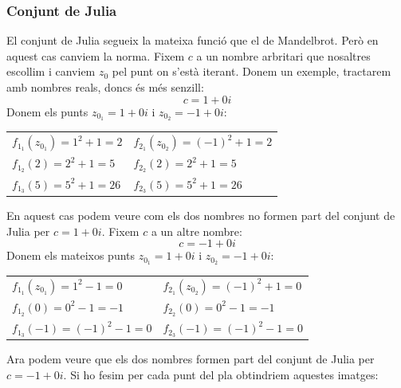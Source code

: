 \subsubsection{Conjunt de Julia}
El conjunt de Julia segueix la mateixa funció que el de Mandelbrot. Però en aquest cas canviem la norma. Fixem $c$ a un nombre arbritari que nosaltres escollim i canviem $z_0$ pel punt on s'està iterant. Donem un exemple, tractarem amb nombres reals, doncs és més senzill:
\[c = 1 + 0i\]
Donem els punts $z_{0_1} = 1 + 0i$ i $z_{0_2} = -1 + 0i$: \newline
\begin{center}
\begin{tabularx}{0.8\textwidth} {
  >{\centering\arraybackslash}X |
  >{\centering\arraybackslash}X}
  \(f_{1_1}(z_{0_1}) = 1^2 + 1 = 2\) \vspace*{3mm} & \(f_{2_1}(z_{0_2}) = (-1)^2 + 1 = 2\) \\
  \(f_{1_2}(2) = 2^2 + 1 = 5\) \vspace*{3mm} & \(f_{2_2}(2) = 2^2 + 1 = 5\) \\
  \(f_{1_3}(5) = 5^2 + 1 = 26\) & \(f_{2_3}(5) = 5^2 + 1 = 26\)
\end{tabularx}
\end{center}
\noindent \newline
En aquest cas podem veure com els dos nombres no formen part del conjunt de Julia per $c = 1 + 0i$. \n
Fixem $c$ a un altre nombre:
\[c = -1 + 0i\]
Donem els mateixos punts $z_{0_1} = 1 + 0i$ i $z_{0_2} = -1 + 0i$: \newline
\begin{center}
\begin{tabularx}{0.8\textwidth} {
  >{\centering\arraybackslash}X |
  >{\centering\arraybackslash}X}
  \(f_{1_1}(z_{0_1}) = 1^2 - 1 = 0\) \vspace*{3mm} & \(f_{2_1}(z_{0_2}) = (-1)^2 + 1 = 0\) \\
  \(f_{1_2}(0) = 0^2 - 1 = -1\) \vspace*{3mm} & \(f_{2_2}(0) = 0^2 - 1 = -1\) \\
  \(f_{1_3}(-1) = (-1)^2 - 1 = 0\) & \(f_{2_3}(-1) = (-1)^2 - 1 = 0\)
\end{tabularx}
\end{center}
\noindent \newline
Ara podem veure que els dos nombres formen part del conjunt de Julia per $c = -1 + 0i$. \n
Si ho fesim per cada punt del pla obtindriem aquestes imatges:

